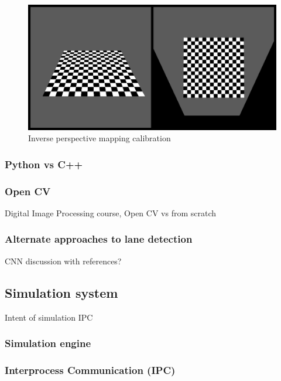 \documentclass[]{aiaa-tc}%
\begin{document}
\begin{figure}[htb]%
	\includegraphics{InversePerspectiveEg.png}
	\caption{Inverse perspective mapping calibration}
	\label{f:inverse_perspective_calibration}
\end{figure}


\subsubsection{Python vs C++}

\subsubsection{Open CV}
Digital Image Processing course, Open CV vs from scratch

\subsubsection{Alternate approaches to lane detection}
CNN discussion with references?

\subsection{Simulation system}
Intent of simulation
IPC

\subsubsection{Simulation engine}


\subsubsection{Interprocess Communication (IPC)}
\end{document}

